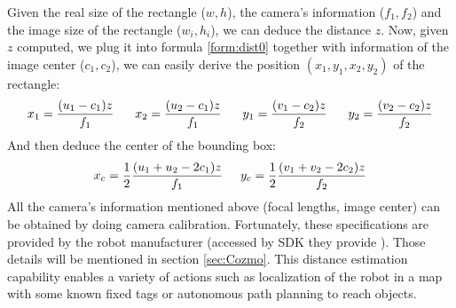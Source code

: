 Given the real size of the rectangle ($w, h$), the camera's information ($f_1, f_2$) and the image size of the rectangle ($w_i, h_i$), we can deduce the distance $z$. Now, given $z$ computed, we plug it into formula \ref{form:dist0} together with information of the image center ($c_1, c_2$), we can easily derive the position $(x_1, y_1, x_2, y_2)$ of the rectangle:
\begin{align}
	x_1 = \frac{(u_1 - c_1)z}{f_1} \hspace{0.6cm}
	x_2 = \frac{(u_2 - c_1)z}{f_1} \hspace{0.6cm}
	y_1 = \frac{(v_1 - c_2)z}{f_2} \hspace{0.6cm}
	y_2 = \frac{(v_2 - c_2)z}{f_2} 
\end{align}
And then deduce the center of the bounding box:
\begin{align}
	\label{form:centerIm}
x_c = \frac{1}{2}\frac{(u_1 + u_2 - 2 c_1)z}{f_1} \hspace{0.5cm} y_c = \frac{1}{2}\frac{(v_1 + v_2 - 2 c_2)z}{f_2}
\end{align}
All the camera's information mentioned above (focal lengths, image center) can be obtained by doing camera calibration. Fortunately, these specifications are provided by the robot manufacturer (accessed by SDK they provide \cite{ANKI:2017}). Those details will be mentioned in section \ref{sec:Cozmo}.
This distance estimation capability enables a variety of actions such as localization of the robot in a map with some known fixed tags or autonomous path planning to reach objects.
